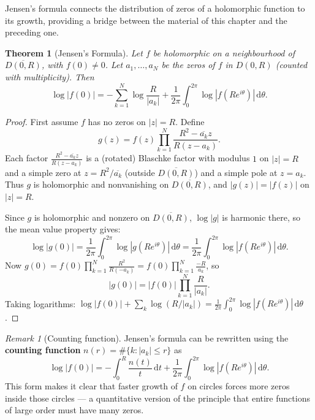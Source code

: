 \documentclass[12pt,a4paper,openany]{book}
\theoremstyle{definition}
\theoremstyle{plain}
\newtheorem{theorem}[definition]{Theorem}
\theoremstyle{remark}
\newtheorem{remark}[definition]{Remark}
\newcommand{\dd}{\mathrm{d}}
\newcommand{\abs}[1]{\left|#1\right|}
\newcommand{\conj}[1]{\overline{#1}}
\begin{document}
Jensen's formula connects the distribution of zeros of a holomorphic
function to its growth, providing a bridge between the material of this
chapter and the preceding one.

\begin{theorem}[Jensen's Formula]\label{thm:jensen}
Let $f$ be holomorphic on a neighbourhood of $\overline{D(0,R)}$,
with $f(0) \neq 0$. Let $a_1, \ldots, a_N$ be the zeros of $f$ in
$D(0,R)$ (counted with multiplicity). Then
\begin{equation}\label{eq:jensen}
  \log\abs{f(0)} = -\sum_{k=1}^{N}\log\frac{R}{\abs{a_k}}
  + \frac{1}{2\pi}\int_0^{2\pi}\log\abs{f(Re^{i\theta})}\,\dd\theta.
\end{equation}
\end{theorem}

\begin{proof}
First assume $f$ has no zeros on $\abs{z}=R$. Define
\[
  g(z) = f(z)\prod_{k=1}^{N}\frac{R^2 - \conj{a_k}z}{R(z-a_k)}.
\]
Each factor $\frac{R^2-\conj{a_k}z}{R(z-a_k)}$ is a (rotated) Blaschke factor
with modulus $1$ on $\abs{z}=R$ and a simple zero at $z = R^2/\conj{a_k}$
(outside $\overline{D(0,R)}$) and a simple pole at $z = a_k$. Thus $g$
is holomorphic and nonvanishing on $\overline{D(0,R)}$, and
$\abs{g(z)} = \abs{f(z)}$ on $\abs{z} = R$.

Since $g$ is holomorphic and nonzero on $\overline{D(0,R)}$, $\log\abs{g}$
is harmonic there, so the mean value property gives:
\[
  \log\abs{g(0)} = \frac{1}{2\pi}\int_0^{2\pi}\log\abs{g(Re^{i\theta})}\,\dd\theta
  = \frac{1}{2\pi}\int_0^{2\pi}\log\abs{f(Re^{i\theta})}\,\dd\theta.
\]
Now $g(0) = f(0)\prod_{k=1}^{N}\frac{R^2}{R(-a_k)}
= f(0)\prod_{k=1}^{N}\frac{-R}{a_k}$, so
\[
  \abs{g(0)} = \abs{f(0)}\prod_{k=1}^{N}\frac{R}{\abs{a_k}}.
\]
Taking logarithms:
$\log\abs{f(0)} + \sum_k \log(R/\abs{a_k}) = \frac{1}{2\pi}\int_0^{2\pi}\log\abs{f(Re^{i\theta})}\,\dd\theta$.
\end{proof}

\begin{remark}[Counting function]\label{rem:counting-function}
Jensen's formula can be rewritten using the \textbf{counting function}
$n(r) = \#\{k : \abs{a_k} \leq r\}$ as
\[
  \log\abs{f(0)} = -\int_0^R \frac{n(t)}{t}\,\dd t
  + \frac{1}{2\pi}\int_0^{2\pi}\log\abs{f(Re^{i\theta})}\,\dd\theta.
\]
This form makes it clear that faster growth of $f$ on circles forces
more zeros inside those circles — a quantitative version of the principle
that entire functions of large order must have many zeros.
\end{remark}
\end{document}
